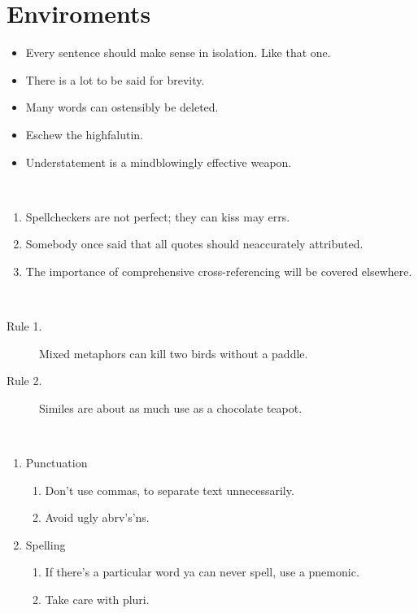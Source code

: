 \documentclass{article}
\begin{document}
\section{Enviroments}

\begin{itemize}
	\item Every sentence should make sense in isolation. 
	Like that one.
	\item There is a lot to be said for brevity.
	\item Many words can ostensibly be deleted.
	\item Eschew the highfalutin.
	\item Understatement is a mindblowingly effective weapon.
\end{itemize}	
\ \\	
	
\begin{enumerate}
	\item Spellcheckers are not perfect; they can kiss may errs.
	\item Somebody once said that all quotes should neaccurately attributed.
	\item The importance of comprehensive cross-referencing will be covered elsewhere.
\end{enumerate}	
\ \\

\begin{description}
		\item[Rule 1.] Mixed metaphors can kill two birds without a paddle.
		\item[Rule 2.] Similes are about as much use as a chocolate teapot.	 
\end{description}
\ \\

\begin{enumerate}
	\item Punctuation
	\begin{enumerate}
		\item Don't use commas, to separate text unnecessarily.
		\item Avoid ugly abrv's'ns.
	\end{enumerate}
	\item Spelling
	\begin{enumerate}
		\item If there's a particular word ya can never spell, use a pnemonic.
		\item Take care with pluri.
	\end{enumerate}	
\end{enumerate}
\ \\ \ \\ \ \\ \ \\ \ \\ \ \\ \ \\ \ \\ \ \\ \ \\ \ \\ \ \\ \ \\ \ \\ \ \\
\end{document}
